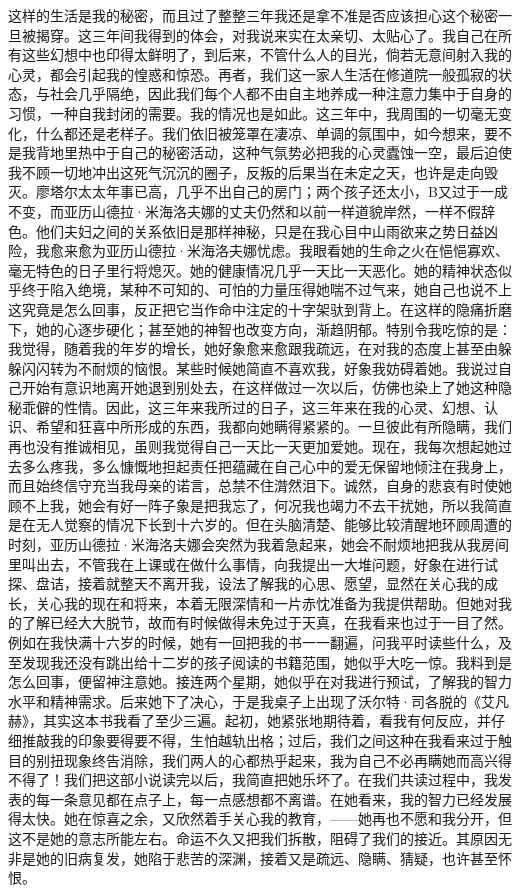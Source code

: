 \documentclass[12pt, UTF8]{ctexbook}
\begin{document}
\par 这样的生活是我的秘密，而且过了整整三年我还是拿不准是否应该担心这个秘密一旦被揭穿。这三年间我得到的体会，对我说来实在太亲切、太贴心了。我自己在所有这些幻想中也印得太鲜明了，到后来，不管什么人的目光，倘若无意间射入我的心灵，都会引起我的惶惑和惊恐。再者，我们这一家人生活在修道院一般孤寂的状态，与社会几乎隔绝，因此我们每个人都不由自主地养成一种注意力集中于自身的习惯，一种自我封闭的需要。我的情况也是如此。这三年中，我周围的一切毫无变化，什么都还是老样子。我们依旧被笼罩在凄凉、单调的氛围中，如今想来，要不是我背地里热中于自己的秘密活动，这种气氛势必把我的心灵蠹蚀一空，最后迫使我不顾一切地冲出这死气沉沉的圈子，反叛的后果当在未定之天，也许是走向毁灭。廖塔尔太太年事已高，几乎不出自己的房门；两个孩子还太小，B又过于一成不变，而亚历山德拉·米海洛夫娜的丈夫仍然和以前一样道貌岸然，一样不假辞色。他们夫妇之间的关系依旧是那样神秘，只是在我心目中山雨欲来之势日益凶险，我愈来愈为亚历山德拉·米海洛夫娜忧虑。我眼看她的生命之火在悒悒寡欢、毫无特色的日子里行将熄灭。她的健康情况几乎一天比一天恶化。她的精神状态似乎终于陷入绝境，某种不可知的、可怕的力量压得她喘不过气来，她自己也说不上这究竟是怎么回事，反正把它当作命中注定的十字架驮到背上。在这样的隐痛折磨下，她的心逐步硬化；甚至她的神智也改变方向，渐趋阴郁。特别令我吃惊的是：我觉得，随着我的年岁的增长，她好象愈来愈跟我疏远，在对我的态度上甚至由躲躲闪闪转为不耐烦的恼恨。某些时候她简直不喜欢我，好象我妨碍着她。我说过自己开始有意识地离开她退到别处去，在这样做过一次以后，仿佛也染上了她这种隐秘乖僻的性情。因此，这三年来我所过的日子，这三年来在我的心灵、幻想、认识、希望和狂喜中所形成的东西，我都向她瞒得紧紧的。一旦彼此有所隐瞒，我们再也没有推诚相见，虽则我觉得自己一天比一天更加爱她。现在，我每次想起她过去多么疼我，多么慷慨地担起责任把蕴藏在自己心中的爱无保留地倾注在我身上，而且始终信守充当我母亲的诺言，总禁不住潸然泪下。诚然，自身的悲哀有时使她顾不上我，她会有好一阵子象是把我忘了，何况我也竭力不去干扰她，所以我简直是在无人觉察的情况下长到十六岁的。但在头脑清楚、能够比较清醒地环顾周遭的时刻，亚历山德拉·米海洛夫娜会突然为我着急起来，她会不耐烦地把我从我房间里叫出去，不管我在上课或在做什么事情，向我提出一大堆问题，好象在进行试探、盘诘，接着就整天不离开我，设法了解我的心思、愿望，显然在关心我的成长，关心我的现在和将来，本着无限深情和一片赤忱准备为我提供帮助。但她对我的了解已经大大脱节，故而有时候做得未免过于天真，在我看来也过于一目了然。例如在我快满十六岁的时候，她有一回把我的书一一翻遍，问我平时读些什么，及至发现我还没有跳出给十二岁的孩子阅读的书籍范围，她似乎大吃一惊。我料到是怎么回事，便留神注意她。接连两个星期，她似乎在对我进行预试，了解我的智力水平和精神需求。后来她下了决心，于是我桌子上出现了沃尔特·司各脱的《艾凡赫》，其实这本书我看了至少三遍。起初，她紧张地期待着，看我有何反应，并仔细推敲我的印象要得要不得，生怕越轨出格；过后，我们之间这种在我看来过于触目的别扭现象终告消除，我们两人的心都热乎起来，我为自己不必再瞒她而高兴得不得了！我们把这部小说读完以后，我简直把她乐坏了。在我们共读过程中，我发表的每一条意见都在点子上，每一点感想都不离谱。在她看来，我的智力已经发展得太快。她在惊喜之余，又欣然着手关心我的教育，——她再也不愿和我分开，但这不是她的意志所能左右。命运不久又把我们拆散，阻碍了我们的接近。其原因无非是她的旧病复发，她陷于悲苦的深渊，接着又是疏远、隐瞒、猜疑，也许甚至怀恨。
\end{document}
